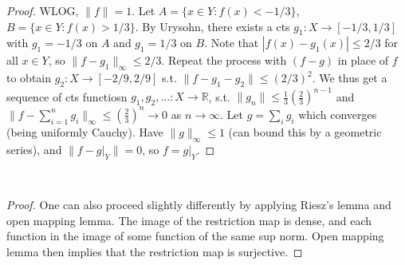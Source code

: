 \documentclass{article}
\theoremstyle{definition}
\theoremstyle{remark}
\theoremstyle{plain}
\newcommand{\RR}{\mathbb{R}}
\begin{document}
\begin{proof}
    WLOG, $\|f\|=1$. Let $A=\{x\in Y:f(x)<-1/3\}$, $B=\{x\in Y:f(x)>1/3\}$. By Urysohn, there exists a cts $g_1:X\to [-1/3,1/3]$ with $g_1=-1/3$ on $A$ and $g_1=1/3$ on $B$. Note that $|f(x)-g_1(x)|\le 2/3$ for all $x\in Y$, so $\|f-g_1\|_\infty\le2/3$. Repeat the process with $(f-g)$ in place of $f$ to obtain $g_2:X\to[-2/9,2/9]$ s.t. $\|f-g_1-g_2\|\le (2/3)^2$. We thus get a sequence of cts functiosn $g_1,g_2,...:X\to\RR$, s.t. $\|g_n\|\le\frac13(\frac23)^{n-1}$ and $\|f-\sum_{i=1}^ng_i\|_\infty\le(\frac23)^n\to0$ as $n\to\infty$. Let $g=\sum_ig_i$ which converges (being uniformly Cauchy). Have $\|g\|_\infty\le 1$ (can bound this by a geometric series), and $\|f-g|_Y\|=0$, so $f=g|_Y$.
\end{proof}\
\begin{proof}
    One can also proceed slightly differently by applying Riesz's lemma and open mapping lemma. The image of the restriction map is dense, and each function in the image of some function of the same sup norm. Open mapping lemma then implies that the restriction map is surjective.
\end{proof}
\end{document}
